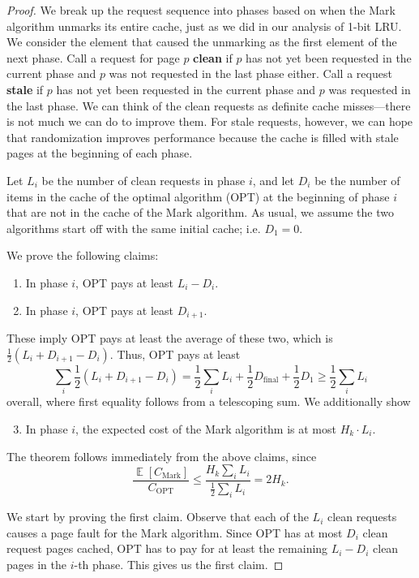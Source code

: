 \documentclass[11pt]{article}
\DeclareMathOperator*{\E}{\mathbb{E}}
\def\on{\operatorname}
\begin{document}
\begin{proof}
  We break up the request sequence into phases based on when the Mark algorithm unmarks its entire cache, just as we did in our analysis of 1-bit LRU. We consider the element that caused the unmarking as the first element of the next phase. Call a request for page $p$ \textbf{clean} if $p$ has not yet been requested in the current phase and $p$ was not requested in the last phase either. Call a request \textbf{stale} if $p$ has not yet been requested in the current phase and $p$ was requested in the last phase. We can think of the clean requests as definite cache misses---there is not much we can do to improve them. For stale requests, however, we can hope that randomization improves performance because the cache is filled with stale pages at the beginning of each phase.

  Let $L_i$ be the number of clean requests in phase $i$, and let $D_i$ be the number of items in the cache of the optimal algorithm (OPT) at the beginning of phase $i$ that are not in the cache of the Mark algorithm. As usual, we assume the two algorithms start off with the same initial cache; i.e. $D_1 = 0$.

  We prove the following claims:
  \begin{enumerate}
    \item
      In phase $i$, OPT pays at least $L_i - D_i$.
    \item
      In phase $i$, OPT pays at least $D_{i+1}$.
  \end{enumerate}
  These imply OPT pays at least the average of these two, which is $\frac 12(L_i + D_{i+1}-D_i)$. Thus, OPT pays at least
  \[ \sum_{i} \frac 12(L_i + D_{i+1} - D_i) = \frac 12\sum_{i} L_i + \frac 12 D_{\on{final}} + \frac 12 D_1 \ge \frac 12\sum_{i} L_i \]
  overall, where first equality follows from a telescoping sum. We additionally show
  \begin{enumerate}
      \setcounter{enumi}{2}
    \item
      In phase $i$, the expected cost of the Mark algorithm is at most $H_k\cdot L_i$.
  \end{enumerate}
  The theorem follows immediately from the above claims, since
  \[ \frac{\E[C_{\on{Mark}}]}{C_{\on{OPT}}} \le \frac{H_k\sum_i L_i}{\frac 12\sum_i L_i} = 2H_k. \]

  We start by proving the first claim. Observe that each of the $L_i$ clean requests causes a page fault for the Mark algorithm. Since OPT has at most $D_i$ clean request pages cached, OPT has to pay for at least the remaining $L_i - D_i$ clean pages in the $i$-th phase. This gives us the first claim.


\end{proof}
\end{document}
